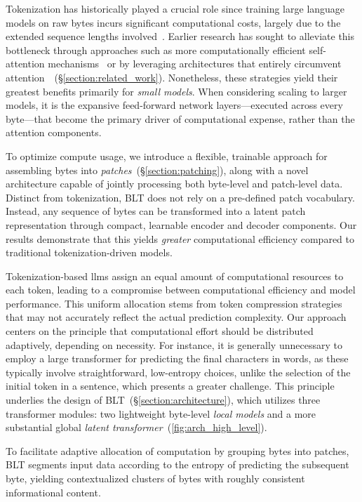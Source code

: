 Tokenization has historically played a crucial role since training large language models on raw bytes incurs significant computational costs, largely due to the extended sequence lengths involved~\citep{xue2022byt5}. Earlier research has sought to alleviate this bottleneck through approaches such as more computationally efficient self-attention mechanisms~\citep{el2020characterbert, clark2022canine} or by leveraging architectures that entirely circumvent attention~\citep{wang2024mambabyte}~(\S\ref{section:related_work}). Nonetheless, these strategies yield their greatest benefits primarily for \textit{small models}. When considering scaling to larger models, it is the expansive feed-forward network layers—executed across every byte—that become the primary driver of computational expense, rather than the attention components.

To optimize compute usage, we introduce a flexible, trainable approach for assembling bytes into \textit{patches}~(\S\ref{section:patching}), along with a novel architecture capable of jointly processing both byte-level and patch-level data. Distinct from tokenization, {\textsc BLT} does not rely on a pre-defined patch vocabulary. Instead, any sequence of bytes can be transformed into a latent patch representation through compact, learnable encoder and decoder components. Our results demonstrate that this yields \textit{greater} computational efficiency compared to traditional tokenization-driven models.

Tokenization-based llms assign an equal amount of computational resources to each token, leading to a compromise between computational efficiency and model performance. This uniform allocation stems from token compression strategies that may not accurately reflect the actual prediction complexity. Our approach centers on the principle that computational effort should be distributed adaptively, depending on necessity. For instance, it is generally unnecessary to employ a large transformer for predicting the final characters in words, as these typically involve straightforward, low-entropy choices, unlike the selection of the initial token in a sentence, which presents a greater challenge. This principle underlies the design of {\textsc BLT}~(\S\ref{section:architecture}), which utilizes three transformer modules: two lightweight byte-level \textit{local models} and a more substantial global \textit{latent transformer}~(\autoref{fig:arch_high_level}). 

To facilitate adaptive allocation of computation by grouping bytes into patches, {\textsc BLT} segments input data according to the entropy of predicting the subsequent byte, yielding contextualized clusters of bytes with roughly consistent informational content.


